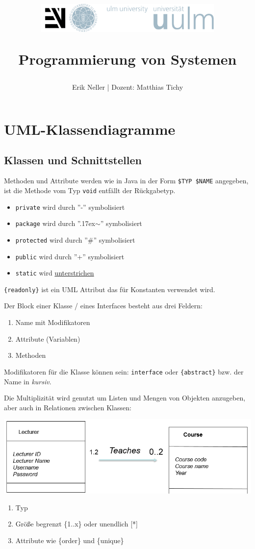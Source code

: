\documentclass[12pt,a4]{article}
\title{
	\begin{figure}
		\centering
		\includegraphics[height=1.5cm]{logo.png}
	\end{figure}
Programmierung von Systemen 
}
\author{Erik Neller | Dozent: Matthias Tichy}
\begin{document}
	
	\maketitle
	\thispagestyle{empty} %
	\newpage
	
	\tableofcontents
	\newpage
	

	\section{UML-Klassendiagramme}
	\subsection{Klassen und Schnittstellen}
	Methoden und Attribute werden wie in Java in der Form \texttt{\$TYP \$NAME} angegeben, ist die Methode vom Typ \texttt{void} entfällt der Rückgabetyp.
	\begin{itemize}
		\item \texttt{private} wird durch ''-'' symbolisiert
		\item \texttt{package} wird durch ''{\raise.17ex\hbox{$\scriptstyle\sim$}}'' symbolisiert
		\item \texttt{protected} wird durch ''\#'' symbolisiert
		\item \texttt{public} wird durch ''+'' symbolisiert
		\item \texttt{static}  wird \underline{unterstrichen}
	\end{itemize}
	\texttt{\{readonly\}} ist ein UML Attribut das für Konstanten verwendet wird. 
	\newline\newline
	
	Der Block einer Klasse / eines Interfaces besteht aus drei Feldern: 
	\begin{enumerate}
		\item Name mit Modifikatoren
		\item Attribute (Variablen)
		\item Methoden
	\end{enumerate}
	 Modifikatoren für die Klasse können sein: \texttt{\flqq interface\frqq} oder \texttt{\{abstract\}} bzw. der Name in \textit{kursiv}.
	 
	 Die Multiplizität wird genutzt um Listen und Mengen von Objekten anzugeben, aber auch in Relationen zwischen Klassen:
	 \begin{center}
	 	\includegraphics[width=0.5\linewidth]{images/multiplicity}
	 \end{center}
	 \begin{enumerate}
	 	\item Typ
	 	\item Größe begrenzt \{1..x\} oder unendlich [*]
	 	\item Attribute wie \{order\} und \{unique\}
	 \end{enumerate}
\end{document}
